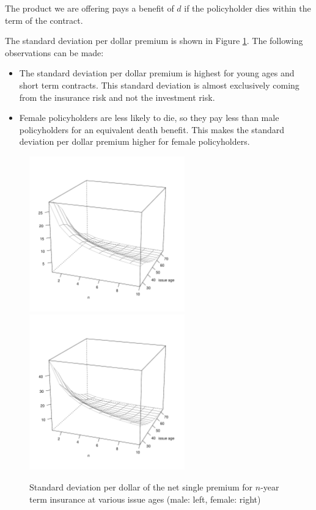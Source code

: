 \documentclass[12pt]{article}
\begin{document}
The product we are offering pays a benefit of $d$ if the policyholder dies within the term of the contract.

The standard deviation per dollar premium is shown in Figure \ref{fig:sdterm}. The following observations can be made:

\begin{itemize}
\item The standard deviation per dollar premium is highest for young ages and short term contracts. This standard deviation is almost exclusively coming from the insurance risk and not the investment risk.
\item Female policyholders are less likely to die, so they pay less than male policyholders for an equivalent death benefit. This makes the standard deviation per dollar premium higher for female policyholders.
\end{itemize}

\begin{figure}[ht]
\begin{center}
\vspace{-20mm}
\centerline{
\includegraphics[width=0.6\textwidth]{images/termSDPlotMale}
\includegraphics[width=0.6\textwidth]{images/termSDPlotFemale}}
\end{center}
\vspace{-10mm}
\caption{Standard deviation per dollar of the net single premium for $n$-year term insurance at various issue ages (male: left, female: right)}
\label{fig:sdterm}
\end{figure}
\end{document}
